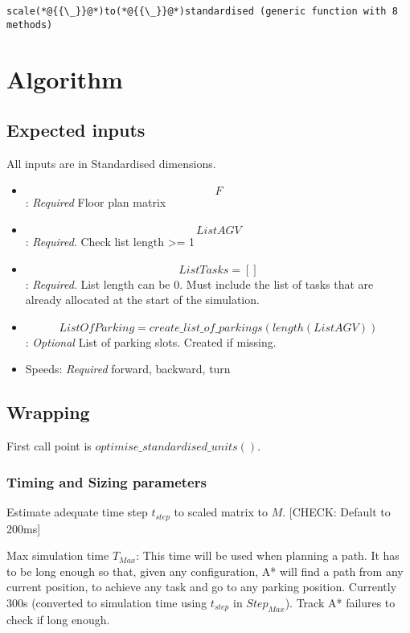 \documentclass[12pt,a4paper]{article}
\begin{document}
\begin{lstlisting}
scale(*@{{\_}}@*)to(*@{{\_}}@*)standardised (generic function with 8 methods)
\end{lstlisting}


\section{Algorithm}
\subsection{Expected inputs}
All inputs are in Standardised dimensions.

\begin{itemize}
\item \[
F
\]
: \emph{Required} Floor plan matrix


\item \[
ListAGV
\]
: \emph{Required}. Check list length >= 1


\item \[
ListTasks = []
\]
: \emph{Required}. List length can be 0. Must include the list of tasks that are already allocated at the start of the simulation.


\item \[
ListOfParking = create\_list\_of\_parkings(length(ListAGV))
\]
: \emph{Optional} List of parking slots. Created if missing.


\item Speeds: \emph{Required} forward, backward, turn

\end{itemize}
\subsection{Wrapping}
First call point is $optimise\_standardised\_units()$.

\subsubsection{Timing and Sizing parameters}
Estimate adequate time step $t_{step}$ to scaled matrix to $M$. [CHECK: Default to 200ms]

Max simulation time $T_{Max}$: This time will be used when planning a path. It has to be long enough so that, given any configuration, A* will find a path from any current position, to achieve any task and go to any parking position. Currently 300s (converted to simulation time using $t_{step}$ in ${Step}_{Max}$). Track A* failures to check if long enough.
\end{document}
